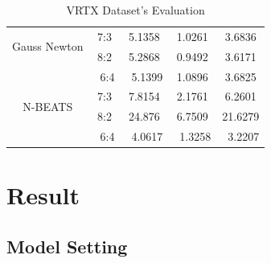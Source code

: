 \documentclass{ieeeojies}
\begin{document}
\begin{table}[H]
\begin{tabular}{|c|c|c|c|c|}
         \hline
         \multirow{2}{*}{Gauss Newton} & 7:3 & 5.1358 & 1.0261 & 3.6836 \\ & 8:2 & 5.2868 & 0.9492 & 3.6171 \\ & \ 6:4} & \ 5.1399 & 1.0896 & 3.6825\\
         \hline
         \multirow{2}{*}{N-BEATS} & 7:3 & 7.8154 & 2.1761 & 6.2601 \\ & 8:2 & 24.876 & 6.7509 & 21.6279 \\ & \ 6:4} & \ 4.0617 & \ 1.3258 & \ 3.2207\\
         \hline
    \end{tabular}
    \caption{VRTX Dataset's Evaluation}
    \label{VRTXresult}
\end{table}

\section{\centering Result}

\subsection{Model Setting}
\end{document}
